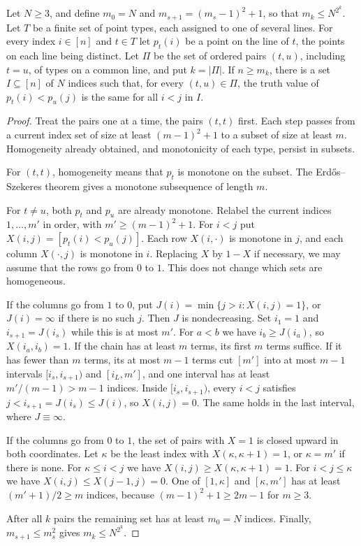\begin{lemma}
\label{lem:order-homogenize}
Let $N\ge3$, and define $m_0=N$ and
$m_{s+1}=(m_s-1)^2+1$, so that $m_k\le N^{2^k}$.
Let $T$ be a finite set of point types, each assigned to
one of several lines.  For every index $i\in[n]$ and
$t\in T$ let $p_t(i)$ be a point on the line of $t$, the
points on each line being distinct.  Let $\Pi$ be the set
of ordered pairs $(t,u)$, including $t=u$, of types on a
common line, and put $k=|\Pi|$.  If $n\ge m_k$, there is a
set $I\subseteq[n]$ of $N$ indices such that, for every
$(t,u)\in\Pi$, the truth value of $p_t(i)<p_u(j)$ is the
same for all $i<j$ in $I$.
\end{lemma}
\begin{proof}
Treat the pairs one at a time, the pairs $(t,t)$ first.
Each step passes from a current index set of size at least
$(m-1)^2+1$ to a subset of size at least $m$.  Homogeneity
already obtained, and monotonicity of each type, persist
in subsets.

For $(t,t)$, homogeneity means that $p_t$ is monotone on
the subset.  The Erd\H{o}s--Szekeres theorem gives a
monotone subsequence of length $m$.

For $t\ne u$, both $p_t$ and $p_u$ are already monotone.
Relabel the current indices $1,\ldots,m'$ in order, with
$m'\ge(m-1)^2+1$.  For $i<j$ put
$X(i,j)=[p_t(i)<p_u(j)]$.  Each row $X(i,\cdot)$ is
monotone in $j$, and each column $X(\cdot,j)$ is monotone
in $i$.  Replacing $X$ by $1-X$ if necessary, we may
assume that the rows go from $0$ to $1$.  This does not
change which sets are homogeneous.

If the columns go from $1$ to $0$, put
$J(i)=\min\{j>i:X(i,j)=1\}$, or $J(i)=\infty$ if there is
no such $j$.  Then $J$ is nondecreasing.  Set $i_1=1$ and
$i_{s+1}=J(i_s)$ while this is at most $m'$.  For $a<b$
we have $i_b\ge J(i_a)$, so $X(i_a,i_b)=1$.  If the chain
has at least $m$ terms, its first $m$ terms suffice.
If it has fewer than $m$ terms, its at most $m-1$ terms cut
$[m']$ into at most $m-1$ intervals
$[i_s,i_{s+1})$ and $[i_L,m']$, and one interval has at
least $m'/(m-1)>m-1$ indices.  Inside $[i_s,i_{s+1})$,
every $i<j$ satisfies $j<i_{s+1}=J(i_s)\le J(i)$, so
$X(i,j)=0$.  The same holds in the last interval,
where $J\equiv\infty$.

If the columns go from $0$ to $1$, the set of pairs with
$X=1$ is closed upward in both coordinates.  Let $\kappa$
be the least index with $X(\kappa,\kappa+1)=1$, or
$\kappa=m'$ if there is none.  For $\kappa\le i<j$ we have
$X(i,j)\ge X(\kappa,\kappa+1)=1$.  For $i<j\le\kappa$ we
have $X(i,j)\le X(j-1,j)=0$.  One of $[1,\kappa]$ and
$[\kappa,m']$ has at least $(m'+1)/2\ge m$ indices,
because $(m-1)^2+1\ge2m-1$ for $m\ge3$.

After all $k$ pairs the remaining set has at least
$m_0=N$ indices.  Finally,
$m_{s+1}\le m_s^2$ gives $m_k\le N^{2^k}$.
\end{proof}

